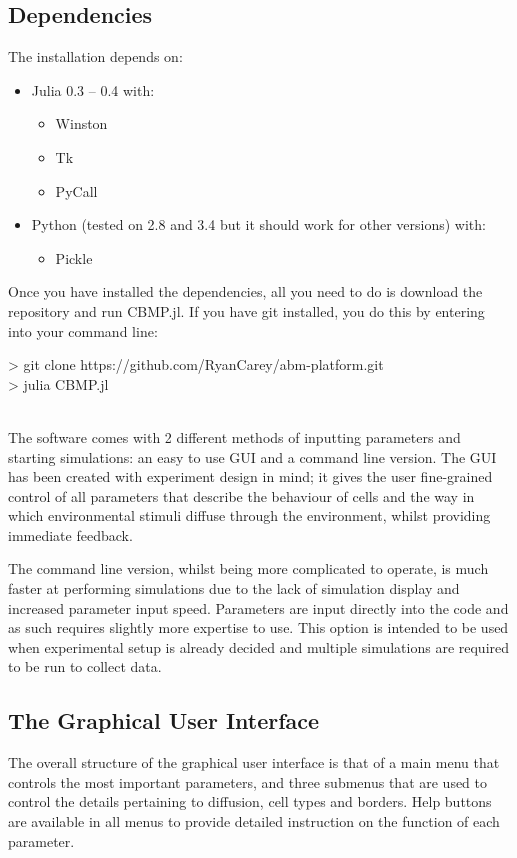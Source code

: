 \documentclass[12pt]{article}
\begin{document}
\subsection{Dependencies}

The installation depends on:

\begin{itemize}
\item Julia 0.3 -- 0.4 with:
\begin{itemize}
\item Winston
\item Tk
\item PyCall
\end{itemize}
\item Python (tested on 2.8 and 3.4 but it should work for other 
versions) with:
\begin{itemize}
\item Pickle
\end{itemize}
\end{itemize}

Once you have installed the dependencies, all you need to do is download 
the repository and run CBMP.jl. If you have git installed, you do this 
by entering into your command line: \\

{\fontsize{11pt}{11pt} \ttfamily 

> git clone https://github.com/RyanCarey/abm-platform.git \\

> julia CBMP.jl} \\

The software comes with 2 different methods of inputting parameters and 
starting simulations: an easy to use GUI and a command line version. The 
GUI has been created with experiment design in mind; it gives the user 
fine-grained control of all parameters that describe the behaviour of 
cells and the way in which environmental stimuli diffuse through the 
environment, whilst providing immediate feedback.

The command line version, whilst being more complicated to operate, is 
much faster at performing simulations due to the lack of simulation 
display and increased parameter input speed. Parameters are input 
directly into the code and as such requires slightly more expertise to 
use. This option is intended to be used when experimental setup is 
already decided and multiple simulations are required to be run to 
collect data.

\subsection{The Graphical User Interface}
The overall structure of the graphical user interface is that of a main 
menu that controls the most important parameters, and three submenus 
that are used to control the details pertaining to diffusion, cell types 
and borders. Help buttons are available in all menus to provide 
detailed instruction on the function of each parameter.
\end{document}
